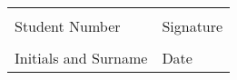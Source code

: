 \vspace{1cm}

\begin{table}[H]
\centering
\small %
\setlength{\tabcolsep}{4pt} %
\begin{tabular}{|p{}|p{}|}
\hline
& \\
Student Number & Signature \\ \hline
& \\
Initials and Surname & Date \\ \hline
\end{tabular}%
\end{table}

\endgroup
